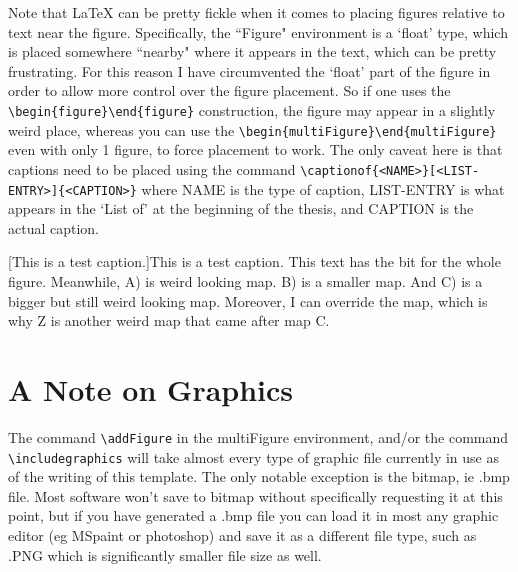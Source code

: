 Note that \LaTeX{} can be pretty fickle when it comes to placing figures relative to text near the figure. Specifically, the ``Figure" environment is a `float' type, which is placed somewhere ``nearby" where it appears in the text, which can be pretty frustrating. For this reason I have circumvented the `float' part of the figure in order to allow more control over the figure placement. So if one uses the \verb|\begin{figure}\end{figure}| construction, the figure may appear in a slightly weird place, whereas you can use the \verb|\begin{multiFigure}\end{multiFigure}| even with only 1 figure, to force placement to work. The only caveat here is that captions need to be placed using the command \verb|\captionof{<NAME>}[<LIST-ENTRY>]{<CAPTION>}| where NAME is the type of caption, LIST-ENTRY is what appears in the `List of' at the beginning of the thesis, and CAPTION is the actual caption.

\begin{flushleft}
\begin{multiFigure}
\begin{center}
\end{center}
[This is a test caption.]{This is a test caption. This text has the bit for the whole figure. Meanwhile, A) is weird looking map. B) is a smaller map. And C) is a bigger but still weird looking map. Moreover, I can override the map, which is why Z is another weird map that came after map C.}

\end{multiFigure}
\end{flushleft}

\section{A Note on Graphics}
The command \verb|\addFigure| in the multiFigure environment, and/or the command \verb|\includegraphics| will take almost every type of graphic file currently in use as of the writing of this template. The only notable exception is the bitmap, ie .bmp file. Most software won't save to bitmap without specifically requesting it at this point, but if you have generated a .bmp file you can load it in most any graphic editor (eg MSpaint or photoshop) and save it as a different file type, such as .PNG which is significantly smaller file size as well. 

